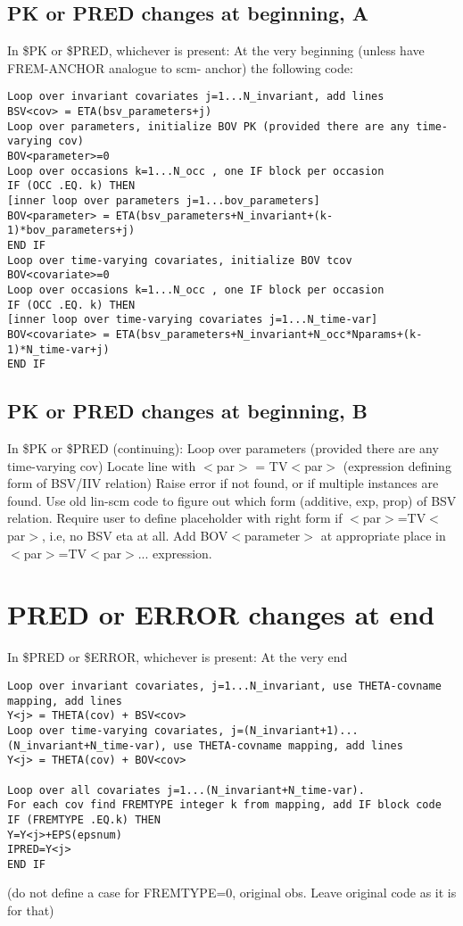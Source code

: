 \subsection{PK or PRED changes at beginning, A}
In \$PK or \$PRED, whichever is present:
At the very beginning (unless have FREM-ANCHOR analogue to scm- anchor) the following code: 
\begin{verbatim}
Loop over invariant covariates j=1...N_invariant, add lines
BSV<cov> = ETA(bsv_parameters+j)
Loop over parameters, initialize BOV PK (provided there are any time-varying cov)
BOV<parameter>=0
Loop over occasions k=1...N_occ , one IF block per occasion
IF (OCC .EQ. k) THEN
[inner loop over parameters j=1...bov_parameters]
BOV<parameter> = ETA(bsv_parameters+N_invariant+(k-1)*bov_parameters+j)
END IF
Loop over time-varying covariates, initialize BOV tcov
BOV<covariate>=0
Loop over occasions k=1...N_occ , one IF block per occasion
IF (OCC .EQ. k) THEN
[inner loop over time-varying covariates j=1...N_time-var]
BOV<covariate> = ETA(bsv_parameters+N_invariant+N_occ*Nparams+(k-1)*N_time-var+j)
END IF
\end{verbatim}

\subsection{PK or PRED changes at beginning, B}
In \$PK or \$PRED (continuing):
Loop over parameters (provided there are any time-varying cov)
Locate line with 
$<$par$>$ = TV$<$par$>$ (expression defining form of BSV/IIV relation)
Raise error if not found, or if multiple instances are found. Use old lin-scm code to figure out which form (additive, exp, prop) of BSV relation. Require user to define placeholder with right form if $<$par$>$=TV$<$par$>$, i.e, no BSV eta at all. Add BOV$<$parameter$>$ at appropriate place in $<$par$>$=TV$<$par$>$... expression.

\section{PRED or ERROR changes at end}
In \$PRED or \$ERROR, whichever is present:
At the very end
\begin{verbatim}
Loop over invariant covariates, j=1...N_invariant, use THETA-covname mapping, add lines
Y<j> = THETA(cov) + BSV<cov>
Loop over time-varying covariates, j=(N_invariant+1)...(N_invariant+N_time-var), use THETA-covname mapping, add lines
Y<j> = THETA(cov) + BOV<cov>

Loop over all covariates j=1...(N_invariant+N_time-var).
For each cov find FREMTYPE integer k from mapping, add IF block code 
IF (FREMTYPE .EQ.k) THEN
Y=Y<j>+EPS(epsnum)
IPRED=Y<j>
END IF
\end{verbatim}
(do not define a case for FREMTYPE=0, original obs. Leave original code as it is for that)


